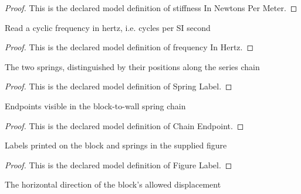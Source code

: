 \begin{proof}
  This is the declared model definition of stiffness In Newtons Per Meter.
\end{proof}
\begin{definition}
  \label{def:physics:phyx-mini-0256:phyxminiproblems-problemphyxmini0256-frequencyinhertz}
  Read a cyclic frequency in hertz, i.e. cycles per SI second
\end{definition}
\begin{proof}
  This is the declared model definition of frequency In Hertz.
\end{proof}
\begin{definition}
  \label{def:physics:phyx-mini-0256:phyxminiproblems-problemphyxmini0256-springlabel}
  The two springs, distinguished by their positions along the series chain
\end{definition}
\begin{proof}
  This is the declared model definition of Spring Label.
\end{proof}
\begin{definition}
  \label{def:physics:phyx-mini-0256:phyxminiproblems-problemphyxmini0256-chainendpoint}
  Endpoints visible in the block-to-wall spring chain
\end{definition}
\begin{proof}
  This is the declared model definition of Chain Endpoint.
\end{proof}
\begin{definition}
  \label{def:physics:phyx-mini-0256:phyxminiproblems-problemphyxmini0256-figurelabel}
  Labels printed on the block and springs in the supplied figure
\end{definition}
\begin{proof}
  This is the declared model definition of Figure Label.
\end{proof}
\begin{definition}
  \label{def:physics:phyx-mini-0256:phyxminiproblems-problemphyxmini0256-motionaxis}
  The horizontal direction of the block's allowed displacement
\end{definition}
